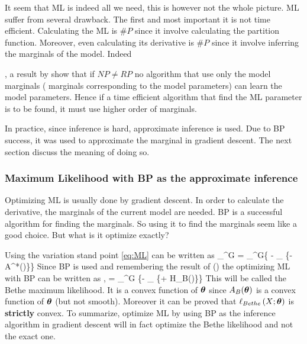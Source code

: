 It seem that ML is indeed all we need, this is however not the whole picture.
ML suffer from several drawback.
The first and most important it is not time efficient.
Calculating the ML is $\#P$ since it involve calculating the partition function.
Moreover, even calculating its derivative is $\#P$ since it involve inferring the marginals of the model.
Indeed , a result by \cite{bresler2014hardness,montanari2015computational} show that if $NP \neq RP$ no algorithm that use only the model marginals ( marginals corresponding to the model parameters) can learn the model parameters. 
Hence if a time efficient algorithm that find the ML parameter is to be found, it must use higher order of marginals.

In practice, since inference is hard, approximate inference is used.
Due to BP success, it was used to approximate the marginal in gradient descent.
The next section discuss the meaning of doing so.
\subsubsection{Maximum Likelihood with BP as the approximate inference}
\label{sec:Bethe_ML}
Optimizing ML is usually done by gradient descent.
In order to calculate the derivative, the marginals of the current model are needed.
BP is a successful algorithm for finding the marginals.
So using it to find the marginals seem like a good choice.
But what is it optimize exactly?

Using the variation stand point \eqref{eq:ML} can be written as
\be
\sup_{\thetav \in \Omega^G}  = \sup_{\thetav \in \Omega^G}\left\{ \mubv \cdot \thetav - \sup_{\muv \in \margpoly} \left\{\muv \cdot \thetav - A^*(\muv)\right\}\right\}
\ee
Since BP is used and remembering the result of \cite{yedidia2000generalized}() the optimizing ML with BP can be written as ,
\be
{}  = \sup_{\thetav \in \Omega^G} \left\{\mubv \cdot \thetav - \sup_{\tauv \in \lclmargpoly} \left\{\tauv \cdot \thetav + H_B(\tauv)\right\}\right\}
\ee
This will be called the Bethe maximum likelihood.
It is a convex function of $\boldsymbol{\theta}$ since $A_B(\boldsymbol{\theta})$ is a convex function of $\boldsymbol{\theta}$ (but not smooth).
Moreover it can be proved that $\ell_{Bethe}\left(X; \boldsymbol{\theta}\right)$ is \textbf{strictly} convex. %
To summarize, optimize ML by using BP as the inference algorithm in gradient descent will in fact optimize the Bethe likelihood and not the exact one.

